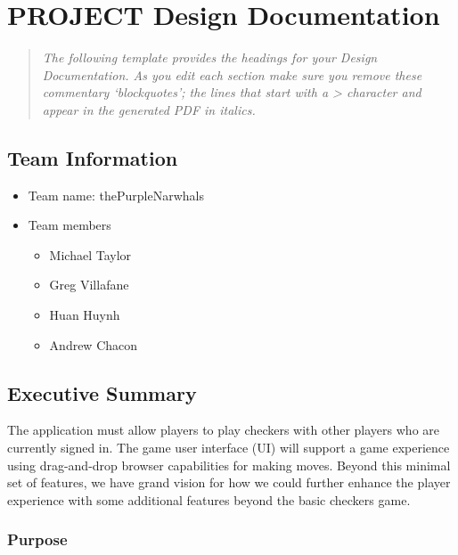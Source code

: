 \hypertarget{project-design-documentation}{%
\section{PROJECT Design
Documentation}\label{project-design-documentation}}

\begin{quote}
\emph{The following template provides the headings for your Design
Documentation. As you edit each section make sure you remove these
commentary `blockquotes'; the lines that start with a \textgreater{}
character and appear in the generated PDF in italics.}
\end{quote}

\hypertarget{team-information}{%
\subsection{Team Information}\label{team-information}}

\begin{itemize}
\tightlist
\item
  Team name: thePurpleNarwhals
\item
  Team members

  \begin{itemize}
  \tightlist
  \item
    Michael Taylor
  \item
    Greg Villafane
  \item
    Huan Huynh
  \item
    Andrew Chacon
  \end{itemize}
\end{itemize}

\hypertarget{executive-summary}{%
\subsection{Executive Summary}\label{executive-summary}}

The application must allow players to play checkers with other players
who are currently signed in. The game user interface (UI) will support a
game experience using drag-and-drop browser capabilities for making
moves. Beyond this minimal set of features, we have grand vision for how
we could further enhance the player experience with some additional
features beyond the basic checkers game.

\hypertarget{purpose}{%
\subsubsection{Purpose}\label{purpose}}

